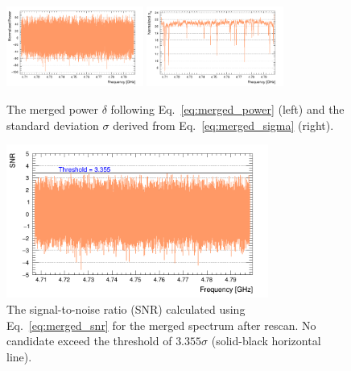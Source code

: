 \begin{figure}[h]
    \centering
    \includegraphics[width=0.4\textwidth,height = 0.3\textwidth]{figures/Power_GrandSpectrum_AxionRun_AllSteps_Rescan_Merged_5bin_SG4_W201_LqWeight.png}
    \includegraphics[width=0.4\textwidth,height = 0.3\textwidth]{figures/Sigma_GrandSpectrum_AxionRun_AllSteps_Rescan_Merged_5bin_SG4_W201_LqWeight.png}
    \caption{The merged power $\delta$ following Eq.~\eqref{eq:merged_power} 
(left) and the standard deviation $\sigma$ derived from Eq.~\eqref{eq:merged_sigma} (right).}
    \label{fig:power_sigma_merged}
\end{figure}

\begin{figure}[hbt!]
    \centering
    \includegraphics[width=8.6cm]{figures/SNR_GrandSpectrum_AxionRun_AllSteps_Rescan_Merged_5bin_SG4_W201_LqWeight.png}
    \caption{The signal-to-noise ratio (SNR) calculated using Eq.~\eqref{eq:merged_snr} for the merged spectrum after rescan. 
No candidate exceed the threshold of 
$3.355\sigma$ (solid-black horizontal line). }
    \label{fig:SNR_merged}
\end{figure}
